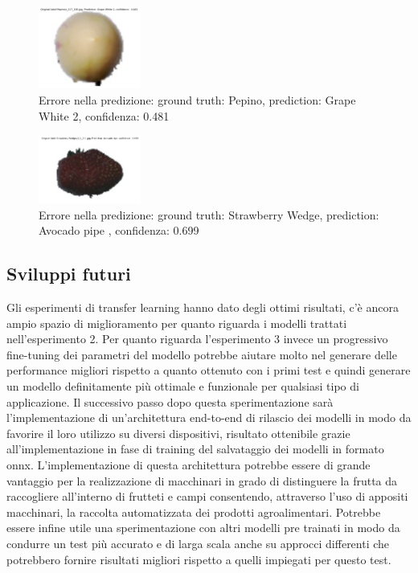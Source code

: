 \begin{figure}[H]
    \centering
    \includegraphics[width=0.3\textwidth]{./resources/error3.png}
    \caption{Errore nella predizione: ground truth: Pepino, prediction: Grape White 2, confidenza: 0.481} 
    \label{fig:error3}
\end{figure}

\begin{figure}[H]
    \centering
    \includegraphics[width=0.3\textwidth]{./resources/error4.png}
    \caption{Errore nella predizione: ground truth: Strawberry Wedge, prediction: Avocado pipe , confidenza: 0.699} 
    \label{fig:error4}
\end{figure}

\subsection{Sviluppi futuri}

Gli esperimenti di transfer learning hanno dato degli ottimi risultati, c'è ancora ampio spazio di miglioramento per quanto riguarda i modelli trattati nell'esperimento 2. Per quanto riguarda l'esperimento 3 invece un progressivo fine-tuning dei parametri del modello potrebbe aiutare molto nel generare delle performance migliori rispetto a quanto ottenuto con i primi test e quindi generare un modello definitamente più ottimale e funzionale per qualsiasi tipo di applicazione.
Il successivo passo dopo questa sperimentazione sarà l'implementazione di un'architettura end-to-end di rilascio dei modelli in modo da favorire il loro utilizzo su diversi dispositivi, risultato ottenibile grazie all'implementazione in fase di training del salvataggio dei modelli in formato onnx.
L'implementazione di questa architettura potrebbe essere di grande vantaggio per la realizzazione di macchinari in grado di distinguere la frutta da raccogliere all'interno di frutteti e campi consentendo, attraverso l'uso di appositi macchinari, la raccolta automatizzata dei prodotti agroalimentari.
Potrebbe essere infine utile una sperimentazione con altri modelli pre trainati in modo da condurre un test più accurato e di larga scala anche su approcci differenti che potrebbero fornire risultati migliori rispetto a quelli impiegati per questo test.


